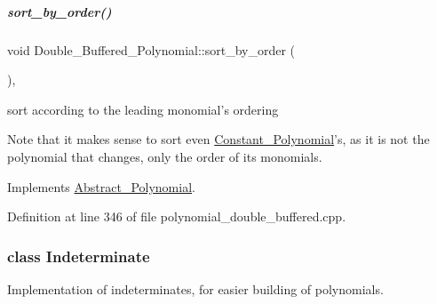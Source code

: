 \mbox{\label{group__polygroup_a41e751eee1614e26ebba39a9f81f7993}} 
\subparagraph{\texorpdfstring{sort\+\_\+by\+\_\+order()}{sort\_by\_order()}}
{\footnotesize\ttfamily void Double\+\_\+\+Buffered\+\_\+\+Polynomial\+::sort\+\_\+by\+\_\+order (\begin{DoxyParamCaption}{ }\end{DoxyParamCaption})\hspace{0.3cm}{\ttfamily [override]}, {\ttfamily [virtual]}}



sort according to the leading monomial's ordering 

Note that it makes sense to sort even \hyperlink{group__polygroup_class_constant___polynomial}{Constant\+\_\+\+Polynomial}'s, as it is not the polynomial that changes, only the order of its monomials. 

Implements \hyperlink{group__polygroup_a1fcdd29c324c660ea935197c39e682f2}{Abstract\+\_\+\+Polynomial}.



Definition at line 346 of file polynomial\+\_\+double\+\_\+buffered.\+cpp.

\label{class_indeterminate}
\subsubsection{class Indeterminate}
Implementation of indeterminates, for easier building of polynomials. 

